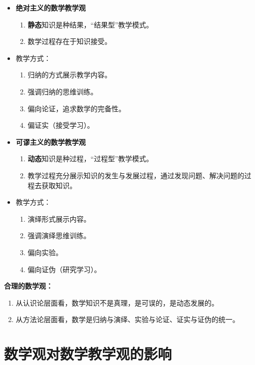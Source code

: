 \begin{multicols}{2}
\begin{itemize}
    \item \textbf{绝对主义的数学教学观}
    \begin{enumerate}
        \item \textbf{静态}知识是种结果，“结果型”教学模式。
        \item 数学过程存在于知识接受。
    \end{enumerate}
    \item 教学方式：
    \begin{enumerate}
        \item 归纳的方式展示教学内容。
        \item 强调归纳的思维训练。
        \item 偏向论证，追求数学的完备性。
        \item 偏证实（接受学习）。
    \end{enumerate}
\end{itemize}
\columnbreak
\begin{itemize}
    \item \textbf{可谬主义的数学教学观}
    \begin{enumerate}
        \item \textbf{动态}知识是种过程，“过程型”教学模式。
        \item 教学过程充分展示知识的发生与发展过程，通过发现问题、解决问题的过程去获取知识。
    \end{enumerate}
    \item 教学方式：
    \begin{enumerate}
        \item 演绎形式展示内容。
        \item 强调演绎思维训练。
        \item 偏向实验。
        \item 偏向证伪（研究学习）。
    \end{enumerate}
\end{itemize}
\end{multicols}

\textbf{合理的数学观：}
    \begin{enumerate}
        \item 从认识论层面看，数学知识不是真理，是可误的，是动态发展的。
        \item 从方法论层面看，数学是归纳与演绎、实验与论证、证实与证伪的统一。
    \end{enumerate}

\section{数学观对数学教学观的影响}

